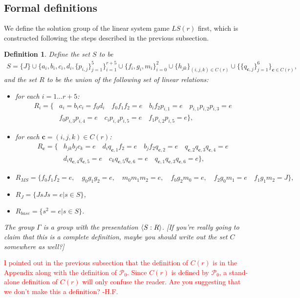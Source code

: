\documentclass[11pt,letterpaper]{article}
\DeclarePairedDelimiter{\ip}{\langle}{\rangle}
\newcommand{\1}{\mathbb{1}}
\newcommand{\Pg}{\mathcal{P}}
\newcommand{\LS}{LS}
\newcommand{\bc}{\pmb{c}}
\def\carl#1{{\color{blue} #1}}
\newcommand{\hfc}[1]{\textcolor{red}{#1 -H.F.}}
\newtheorem{definition}[theorem]{Definition}
\theoremstyle{definition}
\begin{document}
\subsection{Formal definitions}
\label{sec:lsg_def}
We define the solution group of the linear system game $\LS(r)$ first, which is constructed following the steps
described in the previous subsection.
\begin{definition}
\label{def:gamma}
Define the set $S$ to be 
\begin{align*}
	S = \{J\} \cup \{a_i, b_i, c_i, d_i,\{ p_{i,j} \}_{j=1}^5\}_{i=1}^{r+5} \cup \{f_i,g_i,m_i\}_{i=0}^2 \cup \{h_{jk}\}_{(i,j,k) \in C(r)} \cup 
	\{\{q_{\bc,j} \}_{j=1}^6\}_{\bc \in C(r)},
\end{align*}
and the set $R$ to be the union of the following
set of linear relations:
\begin{itemize}
\item for each $i = 1 \dots r+5$:
\begin{align*}
	R_i =  \{ &a_i = b_ic_i = f_0d_i\quad
	f_0 f_1 f_2 = e \quad b_i f_2 p_{i,1} = e \quad p_{i,1} p_{i,2} p_{i,3} = e\\
	&f_0 p_{i,3} p_{i,4} = e \quad c_i p_{i,4} p_{i,5} =e \quad f_1 p_{i,2} p_{i,5} = e\},
\end{align*}
\item for each $ \bc = (i,j,k) \in C(r)$:
\begin{align*}
	R_{\bc} = \{&h_{jk}b_j c_k = e \quad
	d_i q_{\bc,1} f_2 = e \quad b_j f_2 q_{\bc,2} = e \quad q_{\bc,2} q_{\bc,3} q_{\bc,4} = e\\
	&d_i q_{\bc,4} q_{\bc,5} = e \quad c_k q_{\bc,5} q_{\bc,6} =e \quad q_{\bc,1} q_{\bc,3} q_{\bc,6} = e\},
\end{align*}
\item 
$
	R_{MS} = \{f_0 f_1 f_2 = e,\quad g_0 g_1 g_2 = e,\quad m_0 m_1 m_2 = e,\quad
	f_0 g_2 m_0 = e, \quad f_2 g_0 m_1 = e \quad f_1 g_1 m_2 = J\},
$
\item $R_J = \{ JsJs = e \vert s \in S\}$,
\item $R_{base} = \{ s^2 = e \vert s \in S\}$.
\end{itemize}
The group $\Gamma$ is a group with the presentation
$\ip{S:R}$.
\carl{[If you're really going to claim
that this is a complete definition, maybe you should write out the set $C$ somewhere as well?]}
\end{definition}
\hfc{I pointed out in the previous subsection that the definition of $C(r)$ is in the Appendix along with the definition of $\Pg_0$. 
Since $C(r)$ is defined by $\Pg_0$, a stand-alone definition of $C(r)$
will only confuse the reader. Are you suggesting that we don't make this a definition?}
\end{document}
